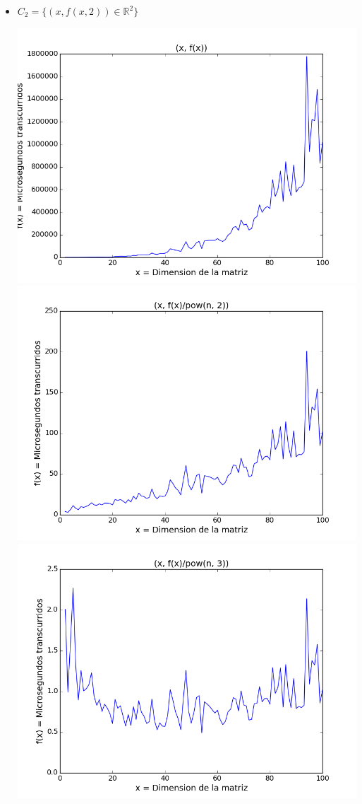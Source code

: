 \begin{itemize}
	\item $C_2 = \{ (x, f(x, 2)) \in \mathbb{R}^2 \}$
	\begin{center}
		\includegraphics[scale=0.54]{images/2potenciafuncion}
		\includegraphics[scale=0.54]{images/2potenciasobrecuadrado}
		\includegraphics[scale=0.54]{images/2potenciasobrecubo}
	\end{center}


\end{itemize}
